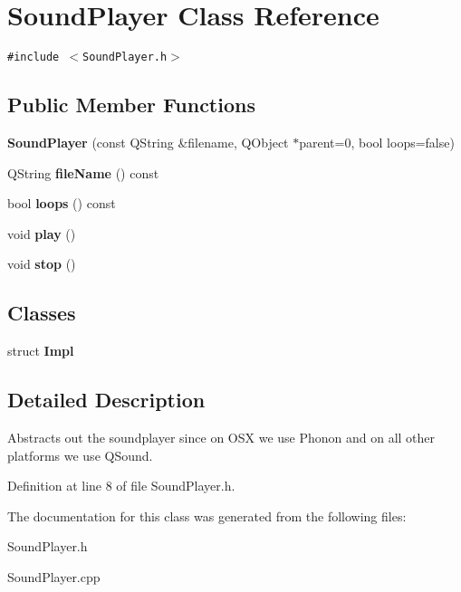 \section{SoundPlayer Class Reference}
\label{classSoundPlayer}
{\tt \#include $<$SoundPlayer.h$>$}

\subsection*{Public Member Functions}
\begin{CompactItemize}
\item 
\textbf{SoundPlayer} (const QString \&filename, QObject $\ast$parent=0, bool loops=false)\label{classSoundPlayer_52bb3dd37bb3af6b78d42ede27ccd9a6}

\item 
QString \textbf{fileName} () const \label{classSoundPlayer_09a11aa0c28e1ec749cb55ae1981a161}

\item 
bool \textbf{loops} () const \label{classSoundPlayer_3e938ca6d719d32a58fae3f2081bef09}

\item 
void \textbf{play} ()\label{classSoundPlayer_15133f4990b8f8375edd0f0e6a8aa25a}

\item 
void \textbf{stop} ()\label{classSoundPlayer_11d2fd57fbb9b0b386451733f9cca5f2}

\end{CompactItemize}
\subsection*{Classes}
\begin{CompactItemize}
\item 
struct \textbf{Impl}
\end{CompactItemize}


\subsection{Detailed Description}
Abstracts out the soundplayer since on OSX we use Phonon and on all other platforms we use QSound. 

Definition at line 8 of file SoundPlayer.h.

The documentation for this class was generated from the following files:\begin{CompactItemize}
\item 
SoundPlayer.h\item 
SoundPlayer.cpp\end{CompactItemize}
